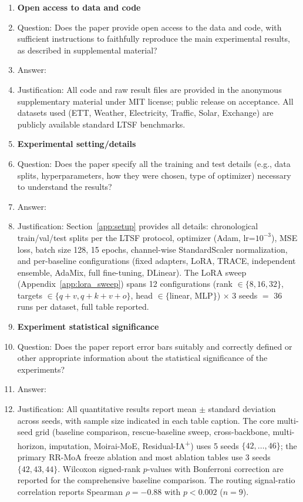 \begin{enumerate}
\item {\bf Open access to data and code}
    \item[] Question: Does the paper provide open access to the data and code, with sufficient instructions to faithfully reproduce the main experimental results, as described in supplemental material?
    \item[] Answer: \answerYes{}
    \item[] Justification: All code and raw result files are provided in the anonymous supplementary material under MIT license; public release on acceptance. All datasets used (ETT, Weather, Electricity, Traffic, Solar, Exchange) are publicly available standard LTSF benchmarks.

\item {\bf Experimental setting/details}
    \item[] Question: Does the paper specify all the training and test details (e.g., data splits, hyperparameters, how they were chosen, type of optimizer) necessary to understand the results?
    \item[] Answer: \answerYes{}
    \item[] Justification: Section~\ref{app:setup} provides all details: chronological train/val/test splits per the LTSF protocol, optimizer (Adam, lr=$10^{-3}$), MSE loss, batch size 128, 15 epochs, channel-wise StandardScaler normalization, and per-baseline configurations (fixed adapters, LoRA, TRACE, independent ensemble, AdaMix, full fine-tuning, DLinear). The LoRA sweep (Appendix~\ref{app:lora_sweep}) spans 12 configurations (rank $\in\{8,16,32\}$, targets $\in\{q{+}v, q{+}k{+}v{+}o\}$, head $\in\{$linear, MLP$\}$) $\times$ 3 seeds $=$ 36 runs per dataset, full table reported.

\item {\bf Experiment statistical significance}
    \item[] Question: Does the paper report error bars suitably and correctly defined or other appropriate information about the statistical significance of the experiments?
    \item[] Answer: \answerYes{}
    \item[] Justification: All quantitative results report mean $\pm$ standard deviation across seeds, with sample size indicated in each table caption. The core multi-seed grid (baseline comparison, rescue-baseline sweep, cross-backbone, multi-horizon, imputation, Moirai-MoE, Residual-IA\textsuperscript{+}) uses 5 seeds $\{42,\dots,46\}$; the primary RR-MoA freeze ablation and most ablation tables use 3 seeds $\{42,43,44\}$. Wilcoxon signed-rank $p$-values with Bonferroni correction are reported for the comprehensive baseline comparison. The routing signal-ratio correlation reports Spearman $\rho{=}{-}0.88$ with $p<0.002$ ($n{=}9$).


\end{enumerate}
